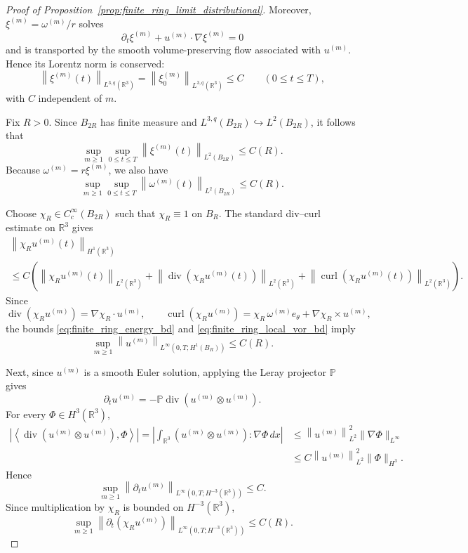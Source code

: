 \documentclass[reqno,11pt]{amsart}
\begin{document}
\begin{proof}[Proof of Proposition~\ref{prop:finite_ring_limit_distributional}]
Moreover, \(\xi^{(m)}=\omega^{(m)}/r\) solves
\[
\partial_t\xi^{(m)}+u^{(m)}\cdot\nabla\xi^{(m)}=0
\]
and is transported by the smooth volume-preserving flow associated with \(u^{(m)}\).
Hence its Lorentz norm is conserved:
\[
\left\|\xi^{(m)}(t)\right\|_{L^{3,q}(\mathbb{R}^3)}
=
\left\|\xi_0^{(m)}\right\|_{L^{3,q}(\mathbb{R}^3)}
\le C
\qquad (0\le t\le T),
\]
with \(C\) independent of \(m\).

Fix \(R>0\). Since \(B_{2R}\) has finite measure and \(L^{3,q}(B_{2R})\hookrightarrow
L^2(B_{2R})\), it follows that
\begin{equation}
\label{eq:finite_ring_loc_rel_vor}
\sup_{m\ge 1}\sup_{0\le t\le T}
\left\|\xi^{(m)}(t)\right\|_{L^2(B_{2R})}
\le C(R).
\end{equation}
Because \(\omega^{(m)}=r\xi^{(m)}\), we also have
\begin{equation}
\sup_{m\ge 1}\sup_{0\le t\le T}
\left\|\omega^{(m)}(t)\right\|_{L^2(B_{2R})}
\le C(R).
\label{eq:finite_ring_local_vor_bd}
\end{equation}

Choose \(\chi_R\in C_c^\infty(B_{2R})\) such that \(\chi_R\equiv 1\) on \(B_R\).
The standard div--curl estimate on \(\mathbb{R}^3\) gives
\begin{multline*}
\left\|\chi_R u^{(m)}(t)\right\|_{H^1(\mathbb{R}^3)}
\\
\leq C\left( 
\left\|\chi_R u^{(m)}(t)\right\|_{L^2(\mathbb{R}^3)}
+\left\|\operatorname{div}\left(\chi_R u^{(m)}(t)\right)\right\|_{L^2(\mathbb{R}^3)}
+\left\|\operatorname{curl}\left(\chi_R u^{(m)}(t)\right)\right\|_{L^2(\mathbb{R}^3)}
\right).
\end{multline*}
Since
\[
\operatorname{div}\left(\chi_R u^{(m)}\right)=\nabla\chi_R\cdot u^{(m)},
\qquad
\operatorname{curl}\left(\chi_R u^{(m)}\right)
=\chi_R\,\omega^{(m)}e_\theta+\nabla\chi_R\times u^{(m)},
\]
the bounds \eqref{eq:finite_ring_energy_bd} and
\eqref{eq:finite_ring_local_vor_bd} imply
\begin{equation}
\sup_{m\ge 1}\left\|u^{(m)}\right\|_{L^\infty\left(0,T;H^1(B_R)\right)}\le C(R).
\label{eq:finite_ring_local_H1_bd}
\end{equation}

Next, since \(u^{(m)}\) is a smooth Euler solution, applying the Leray projector \(\mathbb P\)
gives
\[
\partial_t u^{(m)}=-\mathbb P\operatorname{div}(u^{(m)}\otimes u^{(m)}).
\]
For every \(\Phi\in H^3(\mathbb{R}^3)\),
\begin{align*}
\left|\left\langle \operatorname{div}\left(u^{(m)}\otimes u^{(m)}\right),\Phi\right\rangle\right|
=
\left|\int_{\mathbb{R}^3}\left(u^{(m)}\otimes u^{(m)}\right):\nabla\Phi\,dx\right|
&\le
\left\|u^{(m)}\right\|_{L^2}^2\|\nabla\Phi\|_{L^\infty}
\\
&\leq C
\left\|u^{(m)}\right\|_{L^2}^2\|\Phi\|_{H^3}.
\end{align*}
Hence
\[
\sup_{m\ge 1}
\left\|\partial_t u^{(m)}\right\|_{L^\infty(0,T;H^{-3}(\mathbb{R}^3))}\le C.
\]
Since multiplication by \(\chi_R\) is bounded on \(H^{-3}(\mathbb{R}^3)\),
\[
\sup_{m\ge 1}
\left\|\partial_t\left(\chi_R u^{(m)}\right)\right\|_{L^\infty(0,T;H^{-3}(\mathbb{R}^3))}\le C(R).
\]


\end{proof}
\end{document}
